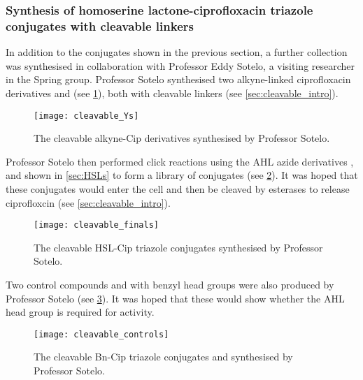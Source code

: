 \subsubsection{Synthesis of homoserine lactone-ciprofloxacin triazole conjugates with cleavable linkers\label{sec:cleavable}}

In addition to the conjugates shown in the previous section, a further collection was synthesised in collaboration with Professor Eddy Sotelo, a visiting researcher in the Spring group. Professor Sotelo synthesised two alkyne-linked ciprofloxacin derivatives  and  (see \ref{fig:cleavable_Ys}), both with cleavable linkers (see \ref{sec:cleavable_intro}). 

\begin{figure}[H]
	\begin{center}
		\texttt{[image: cleavable\_Ys]}
		\caption{
			The cleavable alkyne-Cip derivatives synthesised by Professor Sotelo.
			\label{fig:cleavable_Ys}}
	\end{center}
\end{figure}

Professor Sotelo then performed click reactions using the AHL azide derivatives ,  and  shown in \ref{sec:HSLs} to form a library of conjugates (see \ref{fig:cleavable_finals}). It was hoped that these conjugates would enter the cell and then be cleaved by esterases to release ciprofloxcin (see \ref{sec:cleavable_intro}).

\begin{figure}[H]
	\begin{center}
		\texttt{[image: cleavable\_finals]}
		\caption{
			The cleavable HSL-Cip triazole conjugates synthesised by Professor Sotelo.
			\label{fig:cleavable_finals}}
	\end{center}
\end{figure}

Two control compounds  and  with benzyl head groups were also produced by Professor Sotelo (see \ref{fig:cleavable_controls}). It was hoped that these would show whether the AHL head group is required for activity.

\begin{figure}[H]
	\begin{center}
		\texttt{[image: cleavable\_controls]}
		\caption{
			The cleavable Bn-Cip triazole conjugates  and  synthesised by Professor Sotelo.
			\label{fig:cleavable_controls}}
	\end{center}
\end{figure}


